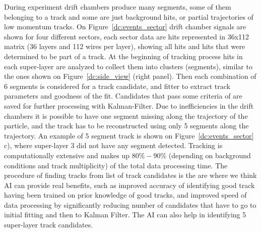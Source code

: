 During experiment drift chambers produce many segments, some of them belonging to a track and some are just background hits, or partial trajectories of low momentum tracks. On Figure~\ref{dc:events_sector} drift chamber signals are shown for four different sectors, each sector data are hits represented in 36x112 matrix (36 layers and 112 wires per layer), showing all hits and hits that were determined to be part of a track. At the beginning of tracking process hits in each super-layer are analyzed to collect them into clusters (segments), similar to the ones shown on Figure~\ref{dc:side_view} (right panel). Then each combination of 6 segments is considered for a track candidate, and fitter to extract track parameters and goodness of the fit. Candidates that pass some criteria of are saved for further processing with Kalman-Filter. Due to inefficiencies in the drift chambers it is possible to have one segment missing along the trajectory of the particle, and the track has to be reconstructed using only 5 segments along the trajectory. An example of 5 segment track is shown on Figure~\ref{dc:events_sector} c), where super-layer 3 did not have any segment detected.
Tracking is computationally extensive and makes up $80\%-90\%$ (depending on background conditions and track multiplicity) of the total data processing time. The procedure of finding tracks from list of track candidates is the are where we think AI can provide real benefits, such as improved accuracy of identifying good track having been trained on prior knowledge  of good tracks, and improved speed of data processing by significantly reducing number of candidates that have to go to initial fitting and then to Kalman Filter. The AI can also help in identifying 5 super-layer track candidates.


